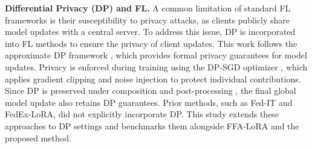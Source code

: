 \textbf{Differential Privacy (DP) and FL.}
A common limitation of standard FL frameworks is their susceptibility to privacy attacks, as clients publicly share model updates with a central server. 
To address this issue, DP is incorporated into FL methods to ensure the privacy of client updates. 
This work follows the approximate DP framework \citep{dwork2006differential, dwork2014algorithmic}, which provides formal privacy guarantees for model updates.
Privacy is enforced during training using the DP-SGD optimizer \citep{dgsgd}, which applies gradient clipping and noise injection to protect individual contributions. 
Since DP is preserved under composition and post-processing \citep{dwork2006differential, 10.14778/3503585.3503598}, the final global model update also retains DP guarantees.
Prior methods, such as Fed-IT and FedEx-LoRA, did not explicitly incorporate DP. 
This study extends these approaches to DP settings and benchmarks them alongside FFA-LoRA and the proposed method.


